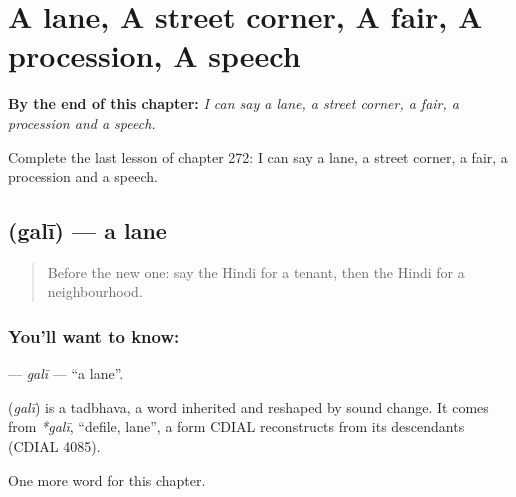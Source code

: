 
\chapter{A lane, A street corner, A fair, A procession, A speech}
\label{ch:hi-a-lane-a-street-corner-a-fair-a-procession-a-speech}

\begin{chapteropening}
\textbf{By the end of this chapter:} \emph{I can say a lane, a street corner, a fair, a procession and a speech.}

Complete the last lesson of chapter 272: I can say a lane, a street corner, a fair, a procession and a speech.
\end{chapteropening}

\section[\texorpdfstring{\hi{गली} (galī)}{गली (galī)}]{ (galī) — a lane}

\label{lesson:HI-C272-gali}



\begin{quote}
Before the new one: say the Hindi for a tenant, then the Hindi for a neighbourhood.
\end{quote}

\subsection*{You'll want to know: }
\textbf{} — \emph{galī} — \textquotedblleft{}a lane\textquotedblright{}.

\begin{cousinweb}
\textbf{} (\emph{galī}) is a tadbhava, a word inherited and reshaped by sound change. It comes from \emph{*galī}, \textquotedblleft{}defile, lane\textquotedblright{}, a form CDIAL reconstructs from its descendants (CDIAL 4085).
\end{cousinweb}

\begin{grammarlens}[title={What you've built}]
One more word for this chapter.
\end{grammarlens}


